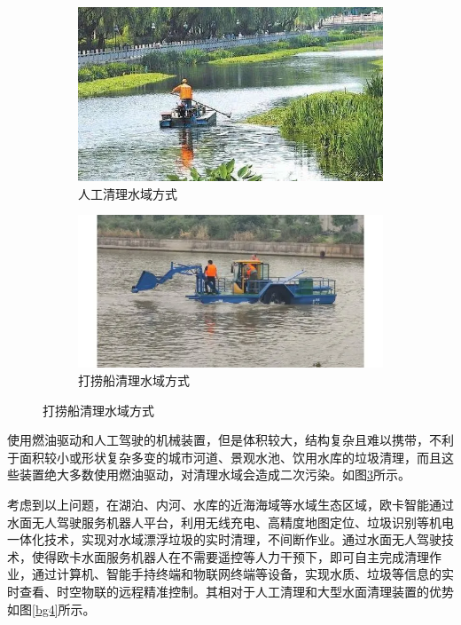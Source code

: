 \documentclass[cn,12pt,color=mine,scheme=chinese,bibstyle=gb7714-2015]{elegantbook}
\begin{document}
\begin{figure}[h]
	\centering
	\begin{subfigure}[b]{0.45\textwidth}
		\centering
		\includegraphics[width=.89\textwidth]{images/bg2}
		\caption{人工清理水域方式}
		\label{bg2}
	\end{subfigure}
	\hfill
	\begin{subfigure}[b]{0.46\textwidth}
		\centering
		\includegraphics[width=\textwidth]{images/bg3}
		\caption{打捞船清理水域方式}
		\label{bg3}
	\end{subfigure}
\end{figure}

\begin{note}[打捞船清理]
	使用燃油驱动和人工驾驶的机械装置，但是体积较大，结构复杂且难以携带，不利于面积较小或形状复杂多变的城市河道、景观水池、饮用水库的垃圾清理，而且这些装置绝大多数使用燃油驱动，对清理水域会造成二次污染。如图\ref{bg3}所示。
\end{note}

考虑到以上问题，在湖泊、内河、水库的近海海域等水域生态区域，欧卡智能通过水面无人驾驶服务机器人平台，利用无线充电、高精度地图定位、垃圾识别等机电一体化技术，实现对水域漂浮垃圾的实时清理，不间断作业。通过水面无人驾驶技术，使得欧卡水面服务机器人在不需要遥控等人力干预下，即可自主完成清理作业，通过计算机、智能手持终端和物联网终端等设备，实现水质、垃圾等信息的实时查看、时空物联的远程精准控制。其相对于人工清理和大型水面清理装置的优势如图\ref{bg4}所示。
\end{document}
